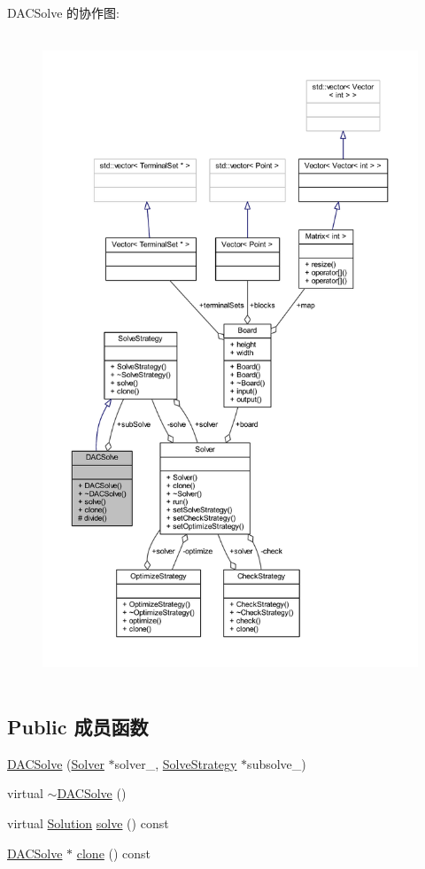 D\+A\+C\+Solve 的协作图\+:
\nopagebreak
\begin{figure}[H]
\begin{center}
\leavevmode
\includegraphics[height=550pt]{classDACSolve__coll__graph}
\end{center}
\end{figure}
\subsection*{Public 成员函数}
\begin{DoxyCompactItemize}
\item 
\hyperlink{classDACSolve_a58d3d76680a09684a84f32615e258da2}{D\+A\+C\+Solve} (\hyperlink{classSolver}{Solver} $\ast$solver\+\_\+, \hyperlink{classSolveStrategy}{Solve\+Strategy} $\ast$subsolve\+\_\+)
\item 
virtual \hyperlink{classDACSolve_a45f18555266f27ff24938f513f416e94}{$\sim$\+D\+A\+C\+Solve} ()
\item 
virtual \hyperlink{classSolution}{Solution} \hyperlink{classDACSolve_a45deda5b055671bbcee609cbf1500fdc}{solve} () const 
\item 
\hyperlink{classDACSolve}{D\+A\+C\+Solve} $\ast$ \hyperlink{classDACSolve_a0d980823220a3a574757c69487b61350}{clone} () const 
\end{DoxyCompactItemize}
